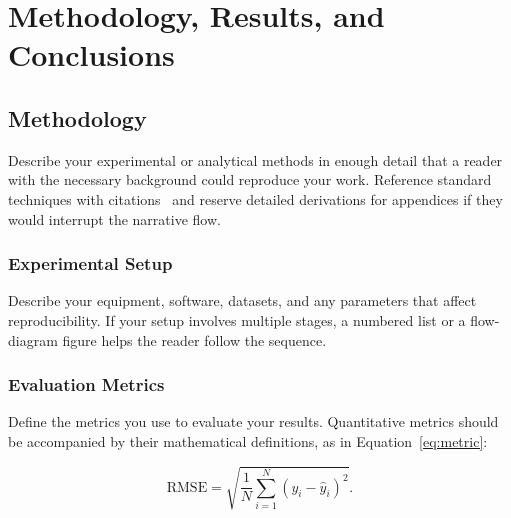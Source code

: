 
\chapter{Methodology, Results, and Conclusions}
\label{ch:methods}
\label{ch:conclusion}

\section{Methodology}
\label{sec:methodology}

Describe your experimental or analytical methods in enough detail that
a reader with the necessary background could reproduce your work.
Reference standard techniques with citations~\cite{kopka1999guide}
and reserve detailed derivations for appendices if they would interrupt
the narrative flow.

\subsection{Experimental Setup}
\label{subsec:setup}

Describe your equipment, software, datasets, and any parameters that
affect reproducibility.
If your setup involves multiple stages, a numbered list or a flow-diagram
figure helps the reader follow the sequence.

\subsection{Evaluation Metrics}
\label{subsec:metrics}

Define the metrics you use to evaluate your results.
Quantitative metrics should be accompanied by their mathematical
definitions, as in Equation~\eqref{eq:metric}:

\begin{equation}
  \label{eq:metric}
  \text{RMSE} = \sqrt{\frac{1}{N}\sum_{i=1}^{N}(y_i - \hat{y}_i)^2}.
\end{equation}

